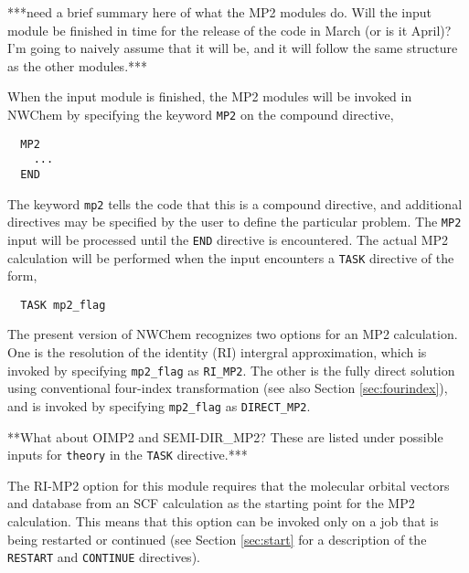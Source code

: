 \label{sec:mp2}
\label{sec:rimp2}
\Large
***need a brief summary here of what the MP2 modules do. Will the input
module be finished in time for the release of the code in March (or is
it April)?  I'm going to naively assume that it will be, and it will follow
the same structure as the other modules.***
\normalsize


When the input module is finished, the MP2 modules will be invoked in NWChem 
by specifying the keyword \verb+MP2+ on the compound directive,

\begin{verbatim}
  MP2
    ...
  END
\end{verbatim}

The keyword \verb+mp2+ tells the code that this is a compound directive,
and additional directives may be specified by the user to define the particular
problem.  The \verb+MP2+ input will be processed until the
\verb+END+ directive is encountered.  The actual MP2 calculation will
be performed when the input encounters a \verb+TASK+ directive of the form,

\begin{verbatim}
  TASK mp2_flag
\end{verbatim}

The present version of NWChem recognizes two options for an MP2 calculation.
One is the
resolution of the identity (RI) intergral approximation, which is invoked
by specifying \verb+mp2_flag+ as \verb+RI_MP2+.  The other is the fully direct
solution using conventional four-index transformation (see also Section 
\ref{sec:fourindex}), and is invoked by
specifying \verb+mp2_flag+ as \verb+DIRECT_MP2+.

\Large
**What about OIMP2 and SEMI-DIR\_MP2?  These are listed under possible
inputs for \verb+theory+ in the \verb+TASK+ directive.***
\normalsize




The RI-MP2 option for this module requires that the molecular orbital
vectors and database from an SCF calculation as the starting point for
the MP2 calculation.  This means that this option can be invoked only
on a job that is being restarted or continued (see Section \ref{sec:start}
for a description of the \verb+RESTART+ and \verb+CONTINUE+ directives).

